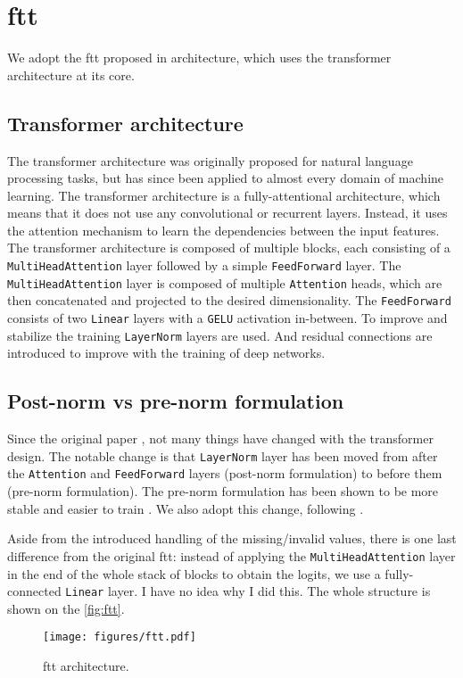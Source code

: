 \section[ft-transformer]{\gls{ftt}}

We adopt the \gls{ftt} proposed in \cite{ft-transformer} architecture, which uses the transformer \cite{transformer}
architecture at its core.

\subsection{Transformer architecture}

The transformer architecture was originally proposed for natural language processing tasks, but has since been applied
to almost every domain of machine learning. The transformer architecture is a fully-attentional architecture, which
means that it does not use any convolutional \cite{convolutional} or recurrent \cite{recurrent} layers. Instead, it uses
the attention mechanism to learn the dependencies between the input features. The transformer architecture is composed
of multiple blocks, each consisting of a \verb|MultiHeadAttention| layer followed by a simple \verb|FeedForward| layer.
The \verb|MultiHeadAttention| layer is composed of multiple \verb|Attention| heads, which are then concatenated and
projected to the desired dimensionality. The \verb|FeedForward| consists of two \verb|Linear| layers with a \verb|GELU|
activation in-between. To improve and stabilize the training \verb|LayerNorm| \cite{layernorm} layers are used. And
residual connections are introduced to improve with the training of deep networks.

\subsection{Post-norm vs pre-norm formulation}

Since the original paper \cite{transformer}, not many things have changed with the transformer design. The notable
change is that \verb|LayerNorm| layer has been moved from after the \verb|Attention| and \verb|FeedForward| layers
(post-norm formulation) to before them (pre-norm formulation). The pre-norm formulation has been shown to be more
stable and easier to train \cite{pre-norm}. We also adopt this change, following \cite{ft-transformer}.

Aside from the introduced handling of the missing/invalid values, there is one last difference from the original
\gls{ftt}: instead of applying the \verb|MultiHeadAttention| layer in the end of the whole stack of blocks to obtain
the logits, we use a fully-connected \verb|Linear| layer. I have no idea why I did this. The whole structure is shown
on the \autoref{fig:ftt}.

\begin{figure}[htbp]
    \centering
    \texttt{[image: figures/ftt.pdf]}
    \caption{\gls{ftt} architecture.}
    \label{fig:ftt}
\end{figure}
